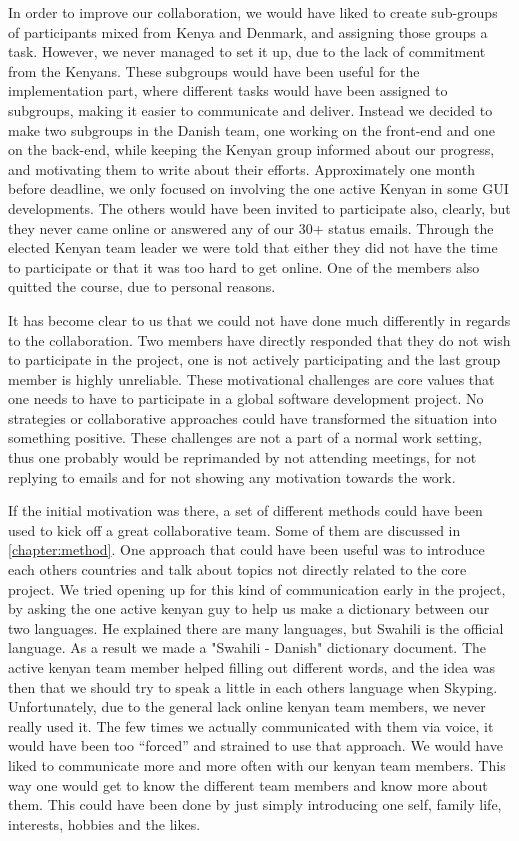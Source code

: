In order to improve our collaboration, we would have liked to create sub-groups of participants mixed from Kenya and Denmark, and assigning those groups a task. However, we never managed to set it up, due to the lack of commitment from the Kenyans. These subgroups would have been useful for the implementation part, where different tasks would have been assigned to subgroups, making it easier to communicate and deliver. Instead we decided to make two subgroups in the Danish team, one working on the front-end and one on the back-end, while keeping the Kenyan group informed about our progress, and motivating them to write about their efforts. Approximately one month before deadline, we only focused on involving the one active Kenyan in some GUI developments. The others would have been invited to participate also, clearly, but they never came online or answered any of our 30+ status emails. Through the elected Kenyan team leader we were told that either they did not have the time to participate or that it was too hard to get online. One of the members also quitted the course, due to personal reasons. 

It has become clear to us that we could not have done much differently in regards to the collaboration. Two members have directly responded that they do not wish to participate in the project, one is not actively participating and the last group member is highly unreliable. These motivational challenges are core values that one needs to have to participate in a global software development project. No strategies or collaborative approaches could have transformed the situation into something positive. These challenges are not a part of a normal work setting, thus one probably would be reprimanded by not attending meetings, for not replying to emails and for not showing any motivation towards the work.

If the initial motivation was there, a set of different methods could have been used to kick off a great collaborative team. Some of them are discussed in \ref{chapter:method}. One approach that could have been useful was to introduce each others countries and talk about topics not directly related to the core project. We tried opening up for this kind of communication early in the project, by asking the one active kenyan guy to help us make a dictionary between our two languages. He explained there are many languages, but Swahili is the official language. As a result we made a "Swahili - Danish" dictionary document. The active kenyan team member helped filling out different words, and the idea was then that we should try to speak a little in each others language when Skyping. Unfortunately, due to the general lack online kenyan team members, we never really used it. The few times we actually communicated with them via voice, it would have been too ``forced'' and strained to use that approach. We would have liked to communicate more and more often with our kenyan team members. This way one would get to know the different team members and know more about them. This could have been done by just simply introducing one self, family life, interests, hobbies and the likes.

